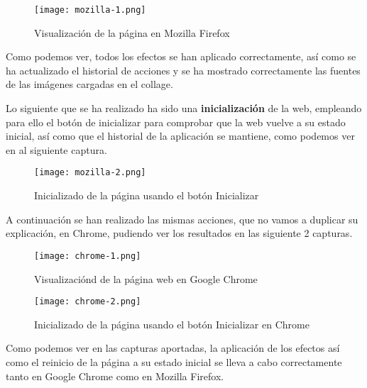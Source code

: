 \begin{figure}[H]
    \centering
    \texttt{[image: mozilla-1.png]}
    \caption{Visualización de la página en Mozilla Firefox}
\end{figure}

Como podemos ver, todos los efectos se han aplicado correctamente, así como se ha actualizado el historial de acciones y se ha mostrado correctamente las fuentes de las imágenes cargadas en el collage.

Lo siguiente que se ha realizado ha sido una \textbf{inicialización} de la web, empleando para ello el botón de inicializar para comprobar que la web vuelve a su estado inicial, así como que el historial de la aplicación se mantiene, como podemos ver en al siguiente captura.

\begin{figure}[H]
    \centering
    \texttt{[image: mozilla-2.png]}
    \caption{Inicializado de la página usando el botón Inicializar}
\end{figure}

A continuación se han realizado las mismas acciones, que no vamos a duplicar su explicación, en Chrome, pudiendo ver los resultados en las siguiente 2 capturas.

\begin{figure}[H]
    \centering
    \texttt{[image: chrome-1.png]}
    \caption{Visualizaciónd de la página web en Google Chrome}
\end{figure}

\begin{figure}[H]
    \centering
    \texttt{[image: chrome-2.png]}
    \caption{Inicializado de la página usando el botón Inicializar en Chrome}
\end{figure}

Como podemos ver en las capturas aportadas, la aplicación de los efectos así como el reinicio de la página a su estado inicial se lleva a cabo correctamente tanto en Google Chrome como en Mozilla Firefox.



%
%

